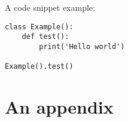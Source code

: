 \documentclass[minted]{cpa-thesis}
\begin{document}
    A code snippet example:
    \begin{verbatim}
class Example():
    def test():
        print('Hello world')

Example().test()
    \end{verbatim}

    \appendix

    \chapter{An appendix}

    \blindtext

    \clearpage \pagestyle{bibliography}
    \printbibliography
\end{document}
